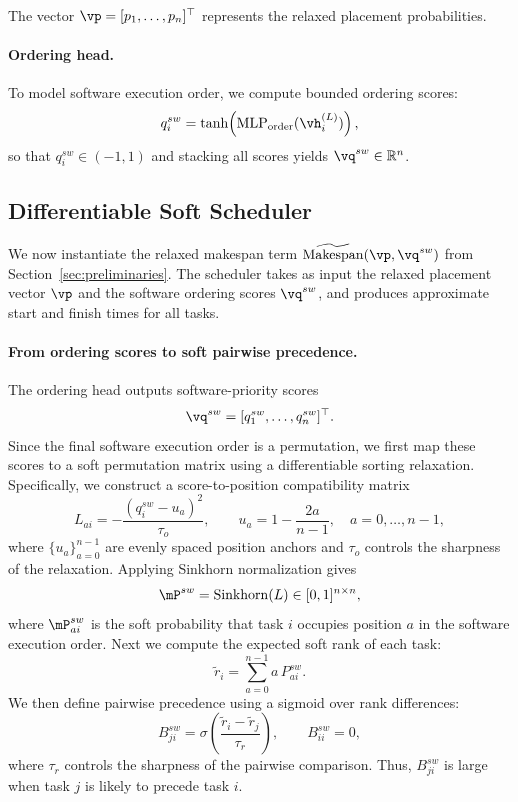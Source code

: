 The vector $\vp = [p_1,\dots,p_n]^\top$ represents the relaxed placement probabilities.

\paragraph{\textbf{Ordering head.}}
To model software execution order, we compute bounded ordering scores:
\begin{equation}
q_i^{sw} = \tanh\!\left(\mathrm{MLP}_{\mathrm{order}}(\vh_i^{(L)})\right),
\end{equation}
so that $q_i^{sw} \in (-1,1)$ and stacking all scores yields $\vq^{sw} \in \mathbb{R}^n$.



\subsection{Differentiable Soft Scheduler}

We now instantiate the relaxed makespan term $\widetilde{\mathrm{Makespan}}(\vp,\vq^{sw})$ from Section~\ref{sec:preliminaries}. The scheduler takes as input the relaxed placement vector $\vp$ and the software ordering scores $\vq^{sw}$, and produces approximate start and finish times for all tasks.

\paragraph{\textbf{From ordering scores to soft pairwise precedence.}}
The ordering head outputs software-priority scores
\begin{equation}
\vq^{sw} = [q_1^{sw},\ldots,q_n^{sw}]^\top.
\end{equation}
Since the final software execution order is a permutation, we first map these scores to a soft permutation matrix using a differentiable sorting relaxation. Specifically, we construct a score-to-position compatibility matrix
\begin{equation}
L_{ai} = -\frac{(q_i^{sw}-u_a)^2}{\tau_o},
\qquad
u_a = 1-\frac{2a}{n-1},
\quad a=0,\ldots,n-1,
\end{equation}
where $\{u_a\}_{a=0}^{n-1}$ are evenly spaced position anchors and $\tau_o$ controls the sharpness of the relaxation. Applying Sinkhorn normalization gives
\begin{equation}
\mP^{sw} = \mathrm{Sinkhorn}(L) \in [0,1]^{n\times n},
\end{equation}
where $\mP^{sw}_{ai}$ is the soft probability that task $i$ occupies position $a$ in the software execution order.
Next we compute the expected soft rank of each task:
\begin{equation}
\tilde r_i = \sum_{a=0}^{n-1} a\,P^{sw}_{ai}.
\end{equation}
We then define pairwise precedence using a sigmoid over rank differences:
\begin{equation}
B^{sw}_{ji}
=
\sigma\!\left(\frac{\tilde r_i-\tilde r_j}{\tau_r}\right),
\qquad
B^{sw}_{ii}=0,
\end{equation}
where $\tau_r$ controls the sharpness of the pairwise comparison. Thus, $B^{sw}_{ji}$ is large when task $j$ is likely to precede task $i$.

